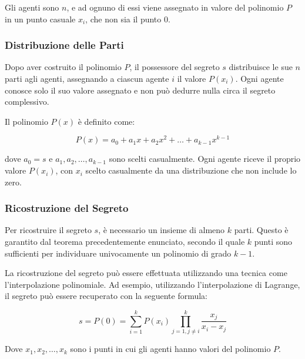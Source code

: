 Gli agenti sono $n$, e ad ognuno di essi viene assegnato in valore del polinomio $P$ in un punto
casuale $x_i$, che non sia il punto $0$. 

\subsubsection{Distribuzione delle Parti}

Dopo aver costruito il polinomio $P$, il possessore del segreto $s$ distribuisce le sue $n$ parti
agli agenti, assegnando a ciascun agente $i$ il valore $P(x_i)$. Ogni agente conosce solo il suo
valore assegnato e non può dedurre nulla circa il segreto complessivo.

Il polinomio $P(x)$ è definito come:

\[ P(x) = a_0 + a_1x + a_2x^2 + \dots + a_{k-1}x^{k-1} \]

dove $a_0 = s$ e $a_1, a_2, \dots, a_{k-1}$ sono scelti casualmente. Ogni agente riceve il proprio
valore $P(x_i)$, con $x_i$ scelto casualmente da una distribuzione che non include lo zero.

\subsubsection{Ricostruzione del Segreto}

Per ricostruire il segreto $s$, è necessario un insieme di almeno $k$ parti. Questo è garantito
dal teorema precedentemente enunciato, secondo il quale $k$ punti sono sufficienti per individuare
univocamente un polinomio di grado $k-1$.

La ricostruzione del segreto può essere effettuata utilizzando una tecnica come l'interpolazione
polinomiale. Ad esempio, utilizzando l'interpolazione di Lagrange, il segreto può essere recuperato
con la seguente formula:

\[ s = P(0) = \sum_{i=1}^{k} P(x_i) \prod_{j=1, j\neq i}^{k} \frac{x_j}{x_i - x_j} \]

Dove $x_1, x_2, \dots, x_k$ sono i punti in cui gli agenti hanno valori del polinomio $P$.
